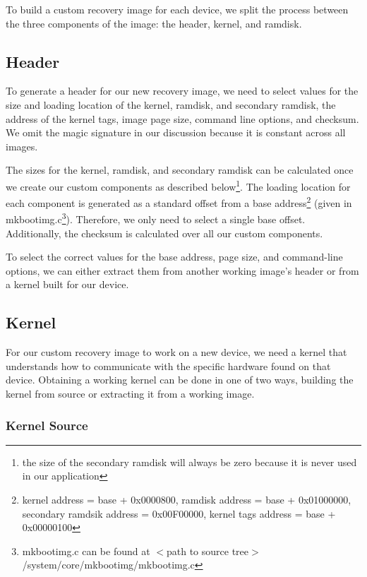 To build a custom recovery image for each device, we split the process between the three components of the image: the header, kernel, and ramdisk.

\subsection{Header}
\label{sec:custom_header}

To generate a header for our new recovery image, we need to select values for the size and loading location of the kernel, ramdisk, and secondary ramdisk, the address of the kernel tags, image page size, command line options, and checksum.  We omit the magic signature in our discussion because it is constant across all images.

The sizes for the kernel, ramdisk, and secondary ramdisk can be calculated once we create our custom components as described below\footnote{the size of the secondary ramdisk will always be zero because it is never used in our application}.  The loading location for each component is generated as a standard offset from a base address\footnote{kernel address = base + 0x0000800, ramdisk address = base + 0x01000000, secondary ramdsik address = 0x00F00000, kernel tags address = base + 0x00000100} (given in mkbootimg.c\footnote{mkbootimg.c can be found at $<$path to source tree$>$/system/core/mkbootimg/mkbootimg.c}).  Therefore, we only need to select a single base offset.  Additionally, the checksum is calculated over all our custom components.

To select the correct values for the base address, page size, and command-line options, we can either extract them from another working image's header or from a kernel built for our device.

\subsection{Kernel}
\label{sec:custom_kernel}

For our custom recovery image to work on a new device, we need a kernel that understands how to communicate with the specific hardware found on that device.  Obtaining a working kernel can be done in one of two ways, building the kernel from source or extracting it from a working image.

\subsubsection{Kernel Source}
\label{sec:kernel_source}

